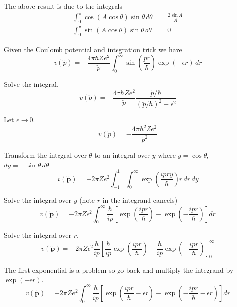 The above result is due to the integrals
\begin{align*}
\int_0^\pi\cos(A\cos\theta)\sin\theta\,d\theta&=\frac{2\sin A}{A}
\\
\int_0^\pi\sin(A\cos\theta)\sin\theta\,d\theta&=0
\end{align*}

Given the Coulomb potential and integration trick we have
\begin{equation*}
v(\breve p)=-\frac{4\pi\hbar Ze^2}{\breve p}
\int_0^\infty\sin\left(\frac{\breve pr}{\hbar}\right)\exp(-\epsilon r)\,dr
\end{equation*}

Solve the integral.
\begin{equation*}
v(\breve p)=-\frac{4\pi\hbar Ze^2}{\breve p}\frac{\breve p/\hbar}{(\breve p/\hbar)^2+\epsilon^2}
\end{equation*}

Let $\epsilon\rightarrow0$.
\begin{equation*}
v(\breve p)=-\frac{4\pi\hbar^2Ze^2}{\breve p^2}
\end{equation*}
\fi

Transform the integral over $\theta$ to an integral over $y$
where $y=\cos\theta$, $dy=-\sin\theta\,d\theta$.
\begin{equation*}
v(\breve{\mathbf p})=-2\pi Ze^2
\int_{-1}^1
\int_0^\infty
\exp\left(\frac{ipry}{\hbar}\right)
r\,dr\,dy
\end{equation*}

Solve the integral over $y$ (note $r$ in the integrand cancels).
\begin{equation*}
v(\breve{\mathbf p})=-2\pi Ze^2
\int_0^\infty
\frac{\hbar}{ip}
\left[\exp\left(\frac{ipr}{\hbar}\right)-\exp\left(-\frac{ipr}{\hbar}\right)\right]
dr
\end{equation*}

Solve the integral over $r$.
\begin{equation*}
v(\breve{\mathbf p})=-2\pi Ze^2\frac{\hbar}{ip}
\left[
\frac{\hbar}{ip}
\exp\left(\frac{ipr}{\hbar}\right)
+\frac{\hbar}{ip}
\exp\left(-\frac{ipr}{\hbar}\right)
\right]_0^\infty
\end{equation*}

The first exponential is a problem
so go back and multiply the integrand by $\exp(-\epsilon r)$.
\begin{equation*}
v(\breve{\mathbf p})=-2\pi Ze^2
\int_0^\infty
\frac{\hbar}{ip}
\left[\exp\left(\frac{ipr}{\hbar}-\epsilon r\right)
-\exp\left(-\frac{ipr}{\hbar}-\epsilon r\right)\right]
dr
\end{equation*}

